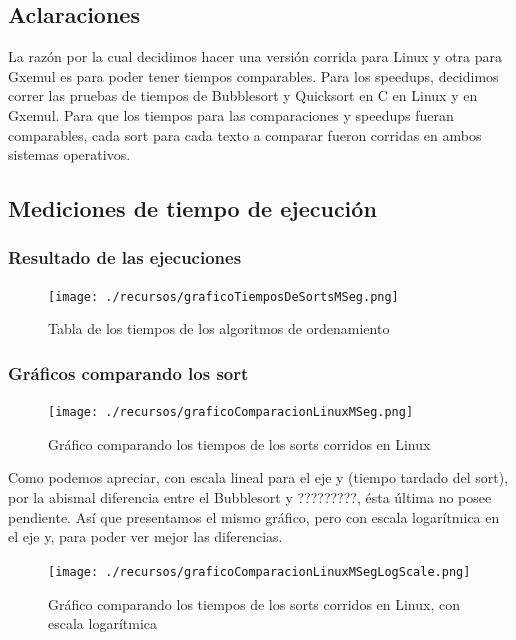 \documentclass[a4paper,10pt]{article}
\begin{document}
\bigskip
\subsection{Aclaraciones}
La raz\'on por la cual decidimos hacer una versi\'on corrida para Linux y otra para Gxemul es para poder tener tiempos comparables. Para los speedups, decidimos correr las pruebas de tiempos de Bubblesort y Quicksort en C en Linux y en Gxemul. Para que los tiempos para las comparaciones y speedups fueran comparables, cada sort para cada texto a comparar fueron corridas en ambos sistemas operativos.



\newpage
\subsection{Mediciones de tiempo de ejecuci\'on}
\subsubsection{Resultado de las ejecuciones}

\begin{figure}[h!]
	\centering
	\texttt{[image: ./recursos/graficoTiemposDeSortsMSeg.png]}
	\caption{Tabla de los tiempos de los algoritmos de ordenamiento}
\end{figure}

\subsubsection{Gr\'aficos comparando los sort}

\begin{figure}[h!]
	\centering
	\texttt{[image: ./recursos/graficoComparacionLinuxMSeg.png]}
	\caption{Gr\'afico comparando los tiempos de los sorts corridos en Linux}
\end{figure}

\bigskip
Como podemos apreciar, con escala lineal para el eje y (tiempo tardado del sort), por la abismal diferencia entre el Bubblesort y ?????????, \'esta \'ultima no posee pendiente. As\'i que presentamos el mismo gr\'afico, pero con escala logar\'itmica en el eje y, para poder ver mejor las diferencias.

\begin{figure}[h!]
	\centering
	\texttt{[image: ./recursos/graficoComparacionLinuxMSegLogScale.png]}
	\caption{Gr\'afico comparando los tiempos de los sorts corridos en Linux, con escala logar\'itmica}
\end{figure}
\end{document}
